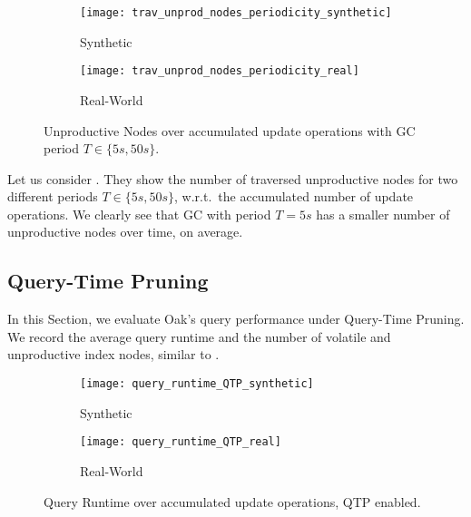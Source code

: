 \documentclass[abstracton,12pt]{scrartcl}
\theoremstyle{definition}
\begin{document}
\vspace{-0.8cm}

\begin{figure}[H]
  \centering
  \begin{subfigure}{0.49\linewidth}
    \centering
    \caption{Synthetic}
    \texttt{[image: trav\_unprod\_nodes\_periodicity\_synthetic]}
    \label{fig:trav_unprod_nodes_periodicity_synthetic}
  \end{subfigure}
  \begin{subfigure}{0.49\linewidth}
    \centering
    \caption{Real-World}
    \texttt{[image: trav\_unprod\_nodes\_periodicity\_real]}
    \label{fig:trav_unprod_nodes_periodicity_real}
  \end{subfigure}
  \vspace{-0.65cm}
  \caption[Unproductive Nodes over update operations with GC period $T \in \{5s, 50s\}$]{
  Unproductive Nodes over accumulated update operations with GC period $T \in \{5s, 50s\}$.}
\end{figure}

\vspace{-0.3cm}

Let us consider 
.
They show the number of traversed unproductive nodes for two different periods
$T \in \{5s,50s\}$, w.r.t.\ the accumulated number of update operations. 
We clearly see that GC with
period $T = 5s$ has a smaller number of unproductive nodes over time, on average.

\subsection{Query-Time Pruning}

\label{sec:qtp-experiment}

In this Section, we evaluate Oak's query performance under Query-Time
Pruning. We record the average query runtime and the number of volatile
and unproductive index nodes, similar to .

\begin{figure}[t]
  \centering
  \begin{subfigure}{0.49\linewidth}
    \centering
    \caption{Synthetic}
    \texttt{[image: query\_runtime\_QTP\_synthetic]}
    \label{fig:query_runtime_QTP_synthetic}
  \end{subfigure}
  \begin{subfigure}{0.49\linewidth}
    \centering
    \caption{Real-World}
    \texttt{[image: query\_runtime\_QTP\_real]}
    \label{fig:query_runtime_QTP_real}
  \end{subfigure}
  \vspace{-0.5cm}
  \caption[Query Runtime over accumulated update operations, QTP enabled]{
  Query Runtime over accumulated update operations, QTP enabled.}
\end{figure}
\end{document}
